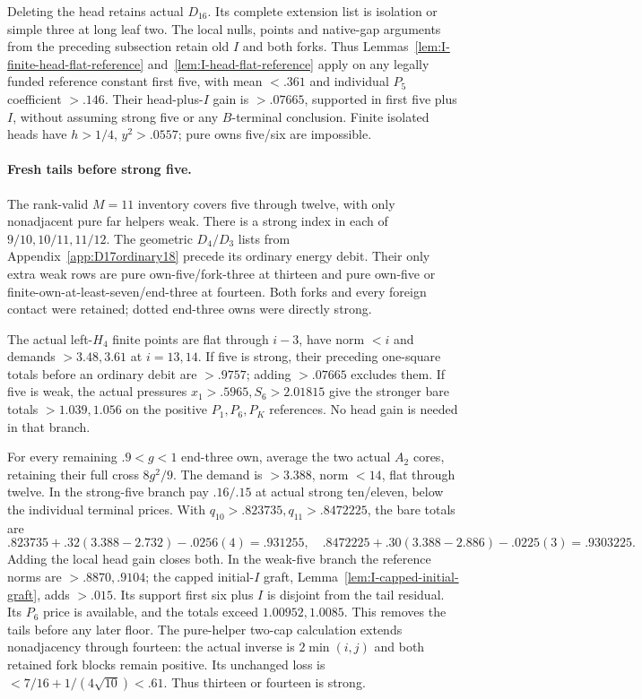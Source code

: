 \documentclass[11pt]{article}
\theoremstyle{definition}
\theoremstyle{remark}
\begin{document}
Deleting the head retains actual \(D_{16}\). Its complete extension
list is isolation or simple three at long leaf two. The local nulls,
points and native-gap arguments from the preceding subsection retain
old \(I\) and both forks. Thus Lemmas~\ref{lem:I-finite-head-flat-reference}
and~\ref{lem:I-head-flat-reference} apply on any legally funded
reference constant first five, with mean \(<.361\) and individual
\(P_5\) coefficient \(>.146\). Their head-plus-\(I\) gain is
\(>.07665\), supported in first five plus \(I\), without assuming
strong five or any \(B\)-terminal conclusion. Finite isolated heads
have \(h>1/4\), \(y^2>.0557\); pure owns five/six are impossible.

\paragraph{Fresh tails before strong five.}
The rank-valid \(M=11\) inventory covers five through twelve, with
only nonadjacent pure far helpers weak. There is a strong index in
each of \(9/10,10/11,11/12\). The geometric \(D_4/D_3\) lists
from Appendix~\ref{app:D17ordinary18} precede its ordinary energy
debit. Their only extra weak rows are pure own-five/fork-three at
thirteen and pure own-five or finite-own-at-least-seven/end-three
at fourteen. Both forks and every foreign contact were retained;
dotted end-three owns were directly strong.

The actual left-\(H_4\) finite points are flat through \(i-3\),
have norm \(<i\) and demands \(>3.48,3.61\) at \(i=13,14\).
If five is strong, their preceding one-square totals before an
ordinary debit are \(>.9757\); adding \(>.07665\) excludes them.
If five is weak, the actual pressures \(x_1>.5965,S_6>2.01815\)
give the stronger bare totals \(>1.039,1.056\) on the positive
\(P_1,P_6,P_K\) references. No head gain is needed in that branch.

For every remaining \(.9<g<1\) end-three own, average the two
actual \(A_2\) cores, retaining their full cross \(8g^2/9\).
The demand is \(>3.388\), norm \(<14\), flat through twelve.
In the strong-five branch pay \(.16/.15\) at actual strong ten/eleven,
below the individual terminal prices. With
\(q_{10}>.823735,q_{11}>.8472225\), the bare totals are
\[
 .823735+.32(3.388-2.732)-.0256(4)=.931255,\quad
 .8472225+.30(3.388-2.886)-.0225(3)=.9303225.
\]
Adding the local head gain closes both. In the weak-five branch the
reference norms are \(>.8870,.9104\); the capped initial-\(I\)
graft, Lemma~\ref{lem:I-capped-initial-graft}, adds \(>.015\).
Its support first six plus \(I\) is disjoint from the tail residual.
Its \(P_6\) price is available, and the totals exceed
\(1.00952,1.0085\). This removes the tails before any later floor.
The pure-helper two-cap calculation extends nonadjacency through
fourteen: the actual inverse is \(2\min(i,j)\) and both retained
fork blocks remain positive. Its unchanged loss is
\(<7/16+1/(4\sqrt{10})<.61\). Thus thirteen or fourteen is strong.
\end{document}
